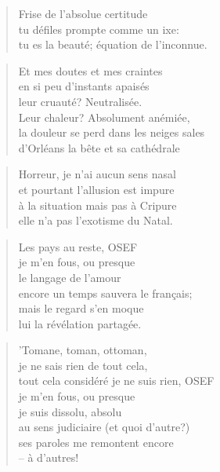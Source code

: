   \begin{verse}
    Frise de l’absolue certitude\\
    tu défiles prompte comme un ixe:\\
    tu es la beauté; équation de l’inconnue.
  \end{verse}
  \begin{verse}
    Et mes doutes et mes craintes\\
    en si peu d’instants apaisés\\
    leur cruauté? Neutralisée.\\
    Leur chaleur? Absolument anémiée,\\
    la douleur se perd dans les neiges sales\\
    d’Orléans la bête et sa cathédrale
  \end{verse}
  \begin{verse}
    Horreur, je n’ai aucun sens nasal\\
    et pourtant l’allusion est impure\\
    à la situation mais pas à Cripure\\
    elle n’a pas l’exotisme du Natal.
  \end{verse}
  \begin{verse}
    Les pays au reste, OSEF\\
    je m’en fous, ou presque\\
    le langage de l’amour\\
    encore un temps sauvera le français;\\
    mais le regard s’en moque\\
    lui la révélation partagée.
  \end{verse}
  \begin{verse}
    ’Tomane, toman, ottoman,\\
    je ne sais rien de tout cela,\\
    tout cela considéré je ne suis rien, OSEF\\
    je m’en fous, ou presque\\
    je suis dissolu, absolu\\
    au sens judiciaire (et quoi d’autre?)\\
    ses paroles me remontent encore\\
    -- à d’autres!
  \end{verse}

